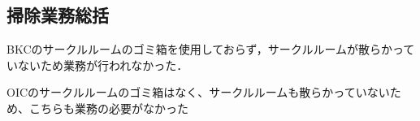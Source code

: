 \subsection*{掃除業務総括}


BKCのサークルルームのゴミ箱を使用しておらず，サークルルームが散らかっていないため業務が行われなかった．

OICのサークルルームのゴミ箱はなく、サークルルームも散らかっていないため、こちらも業務の必要がなかった
